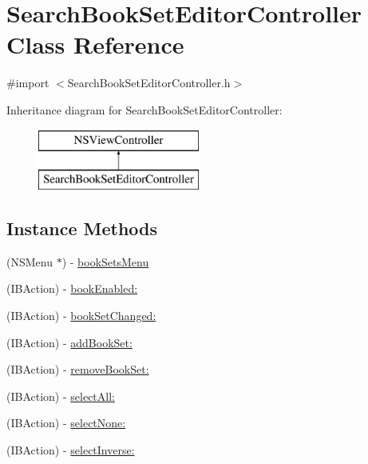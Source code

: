 \hypertarget{interface_search_book_set_editor_controller}{\section{Search\-Book\-Set\-Editor\-Controller Class Reference}
\label{interface_search_book_set_editor_controller}
}


{\ttfamily \#import $<$Search\-Book\-Set\-Editor\-Controller.\-h$>$}

Inheritance diagram for Search\-Book\-Set\-Editor\-Controller\-:\begin{figure}[H]
\begin{center}
\leavevmode
\includegraphics[height=2.000000cm]{interface_search_book_set_editor_controller}
\end{center}
\end{figure}
\subsection*{Instance Methods}
\begin{DoxyCompactItemize}
\item 
(N\-S\-Menu $\ast$) -\/ \hyperlink{interface_search_book_set_editor_controller_a64a01b4ac925fd92b0d7e148ccc8acc2}{book\-Sets\-Menu}
\item 
(I\-B\-Action) -\/ \hyperlink{interface_search_book_set_editor_controller_a99c2feddcb19f46965bc7ae83643aada}{book\-Enabled\-:}
\item 
(I\-B\-Action) -\/ \hyperlink{interface_search_book_set_editor_controller_a5353a8deb8c4c43681675d435bc13a70}{book\-Set\-Changed\-:}
\item 
(I\-B\-Action) -\/ \hyperlink{interface_search_book_set_editor_controller_aaccc106cbf70b0d9b3ab114a1be8a923}{add\-Book\-Set\-:}
\item 
(I\-B\-Action) -\/ \hyperlink{interface_search_book_set_editor_controller_abb1c81637b982d622e5fd0b8ce915389}{remove\-Book\-Set\-:}
\item 
(I\-B\-Action) -\/ \hyperlink{interface_search_book_set_editor_controller_a4b1408b74fbfe3e1a8a8fe97e277b3a7}{select\-All\-:}
\item 
(I\-B\-Action) -\/ \hyperlink{interface_search_book_set_editor_controller_a9f4b5bb48c7622012e794b8169b06796}{select\-None\-:}
\item 
(I\-B\-Action) -\/ \hyperlink{interface_search_book_set_editor_controller_a6e2de0ef74bd2d8741ce7017fd666b37}{select\-Inverse\-:}
\end{DoxyCompactItemize}
